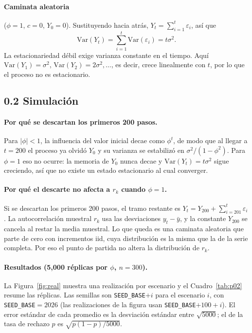 \documentclass[11pt]{article}
\begin{document}
\paragraph{Caminata aleatoria} ($\phi=1$, $c=0$, $Y_0=0$). Sustituyendo hacia
atr\'as, $Y_t=\sum_{i=1}^{t}\varepsilon_i$, as\'i que
\[
\mathrm{Var}(Y_t)=\sum_{i=1}^{t}\mathrm{Var}(\varepsilon_i)=t\sigma^2 .
\]
La estacionariedad d\'ebil exige varianza constante en el tiempo. Aqu\'i
$\mathrm{Var}(Y_1)=\sigma^2$, $\mathrm{Var}(Y_2)=2\sigma^2,\dots$, es decir,
crece linealmente con $t$, por lo que el proceso no es estacionario.

\subsection*{0.2 Simulaci\'on}

\paragraph{Por qu\'e se descartan los primeros 200 pasos.} Para $|\phi|<1$, la
influencia del valor inicial decae como $\phi^t$, de modo que al llegar a
$t=200$ el proceso ya olvid\'o $Y_0$ y su varianza se estabiliz\'o en
$\sigma^2/(1-\phi^2)$. Para $\phi=1$ eso no ocurre: la memoria de $Y_0$ nunca
decae y $\mathrm{Var}(Y_t)=t\sigma^2$ sigue creciendo, as\'i que no existe un
estado estacionario al cual converger.

\paragraph{Por qu\'e el descarte no afecta a $r_k$ cuando $\phi=1$.} Si se
descartan los primeros 200 pasos, el tramo restante es
$Y_t = Y_{200} + \sum_{i=201}^{t}\varepsilon_i$. La autocorrelaci\'on muestral
$r_k$ usa las desviaciones $y_t-\bar{y}$, y la constante $Y_{200}$ se cancela
al restar la media muestral. Lo que queda es una caminata aleatoria que
parte de cero con incrementos iid, cuya distribuci\'on es la misma que la de
la serie completa. Por eso el punto de partida no altera la distribuci\'on de
$r_k$.

\paragraph{Resultados (5{,}000 r\'eplicas por $\phi$, $n=300$).}
La Figura~\ref{fig:real} muestra una realizaci\'on por escenario y el
Cuadro~\ref{tab:p02} resume las r\'eplicas. Las semillas son
\texttt{SEED\_BASE}$+i$ para el escenario $i$, con \texttt{SEED\_BASE}$=2026$
(las realizaciones de la figura usan \texttt{SEED\_BASE}$+100+i$). El error
est\'andar de cada promedio es la desviaci\'on est\'andar entre
$\sqrt{5000}$; el de la tasa de rechazo $p$ es $\sqrt{p(1-p)/5000}$.
\end{document}
